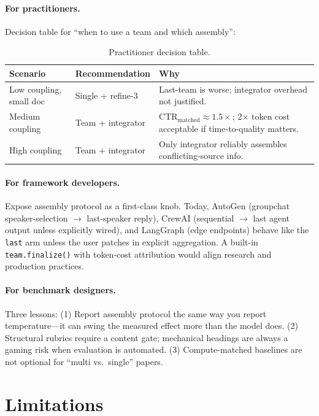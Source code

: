 \documentclass{article}
\newcommand{\ctrm}{\mathrm{CTR}_{\text{matched}}}
\newcommand{\code}[1]{\texttt{#1}}
\begin{document}
\paragraph{For practitioners.} Decision table for ``when to use a team and which assembly'':

\begin{table}[h]
\centering
\small
\caption{Practitioner decision table.}
\begin{tabular}{llp{6.2cm}}
\toprule
Scenario & Recommendation & Why \\
\midrule
Low coupling, small doc & Single + refine-3 & Last-team is worse; integrator overhead not justified. \\
Medium coupling & Team + integrator & $\ctrm \approx 1.5\times$; 2$\times$ token cost acceptable if time-to-quality matters. \\
High coupling & Team + integrator & Only integrator reliably assembles conflicting-source info. \\
\bottomrule
\end{tabular}
\end{table}

\paragraph{For framework developers.} Expose assembly protocol as a first-class knob. Today, AutoGen (groupchat speaker-selection $\to$ last-speaker reply), CrewAI (sequential $\to$ last agent output unless explicitly wired), and LangGraph (edge endpoints) behave like the \code{last} arm unless the user patches in explicit aggregation. A built-in \code{team.finalize()} with token-cost attribution would align research and production practices.

\paragraph{For benchmark designers.} Three lessons: (1) Report assembly protocol the same way you report temperature---it can swing the measured effect more than the model does. (2) Structural rubrics require a content gate; mechanical headings are always a gaming risk when evaluation is automated. (3) Compute-matched baselines are not optional for ``multi vs.\ single'' papers.

\section{Limitations}
\label{sec:limitations}
\end{document}
